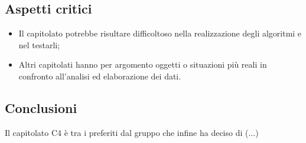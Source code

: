 \subsection{Aspetti critici}
\begin{itemize}
\item Il capitolato potrebbe risultare difficoltoso nella realizzazione degli algoritmi e nel testarli;
\item Altri capitolati hanno per argomento oggetti o situazioni più reali in confronto all'analisi ed elaborazione dei dati.
\end{itemize}

\subsection{Conclusioni}
Il capitolato C4 è tra i preferiti dal gruppo che infine ha deciso di (...)
